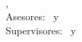 \begin{titlepage}
	\thesisDate \\

\end{titlepage}


\hfill
\vfill
{
	\small
	\textbf{\thesisName} \\
	\textit{\thesisTitle} \\
	\thesisSubject, \thesisDate \\
	Asesores: \thesisFirstReviewer\ y \thesisSecondReviewer \\
	Supervisores: \thesisFirstSupervisor\ y \thesisSecondSupervisor \\[1.5em]
	\textbf{\thesisUniversity} \\
	\textit{\thesisUniversityGroup} \\
	\thesisUniversityInstitute \\
	\thesisUniversityDepartment \\
	\thesisUniversityStreetAddress \\
	\thesisUniversityPostalCode\
}
